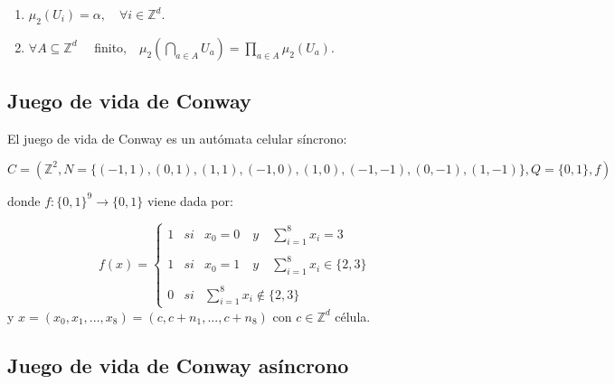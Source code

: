 \documentclass[../proyecto.tex]{memoir}
\begin{document}
\begin{enumerate}
\item $\mu_{2}(U_{i}) = \alpha, \quad \forall i \in \mathds{Z}^{d}$.
\item $ \forall A \subseteq \mathds{Z}^{d} \quad$ finito,$\quad  \mu_{2} ( \bigcap_{a \in A} U_{a} ) = \prod_{a \in A} \mu_{2} ( U_{a} )$.
\end{enumerate}


\subsection{Juego de vida de Conway}

El juego de vida de Conway es un autómata celular síncrono:

\begin{equation}
C = (\mathds{Z}^{2} , N=\{(-1, 1), (0, 1), (1, 1), (-1, 0), (1, 0), (-1,-1), (0,-1), (1,-1) \}, Q=\{0,1\}, f)
\end{equation}
 
donde $f:\{0,1\}^{9} \rightarrow \{0,1\} $ viene dada por:

\begin{equation}
f(x)= \left\{ \begin{array}{lcc}
             1 &   si  & x_{0}=0 \quad y \quad \sum_{i=1}^{8} x_i = 3 \\
             \\ 1 & si & x_{0}=1 \quad y \quad \sum_{i=1}^{8} x_i \in \{2 ,3\} \\
             \\ 0 &  si  & \sum_{i=1}^{8} x_i \notin \{2, 3\} \
             \end{array}
   \right. 
\end{equation}
y $x = (x_{0}, x_{1}, ...,x_{8}) = (c,c+n_{1},...,c+n_{8})$ con $c \in \mathds{Z} ^{d}$ célula.


\subsection{Juego de vida de Conway asíncrono}
\end{document}
